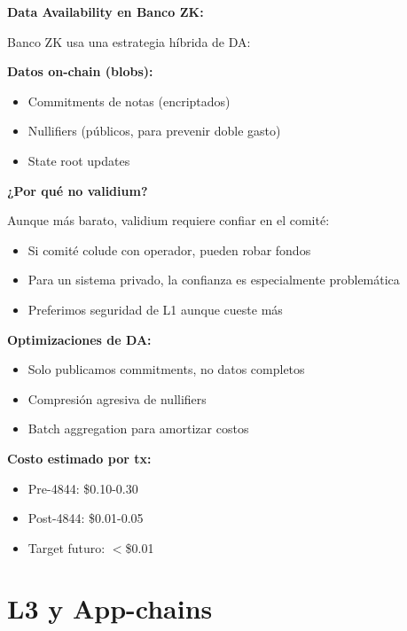 \documentclass[11pt,a4paper,twoside,openright]{book}
\theoremstyle{definition}
\theoremstyle{plain}
\theoremstyle{remark}
\begin{document}
\begin{bancozk}
\textbf{Data Availability en Banco ZK:}

Banco ZK usa una estrategia híbrida de DA:

\textbf{Datos on-chain (blobs):}
\begin{itemize}
    \item Commitments de notas (encriptados)
    \item Nullifiers (públicos, para prevenir doble gasto)
    \item State root updates
\end{itemize}

\textbf{¿Por qué no validium?}

Aunque más barato, validium requiere confiar en el comité:
\begin{itemize}
    \item Si comité colude con operador, pueden robar fondos
    \item Para un sistema privado, la confianza es especialmente problemática
    \item Preferimos seguridad de L1 aunque cueste más
\end{itemize}

\textbf{Optimizaciones de DA:}
\begin{itemize}
    \item Solo publicamos commitments, no datos completos
    \item Compresión agresiva de nullifiers
    \item Batch aggregation para amortizar costos
\end{itemize}

\textbf{Costo estimado por tx:}
\begin{itemize}
    \item Pre-4844: \$0.10-0.30
    \item Post-4844: \$0.01-0.05
    \item Target futuro: $<$\$0.01
\end{itemize}
\end{bancozk}


\section{L3 y App-chains}
\end{document}
